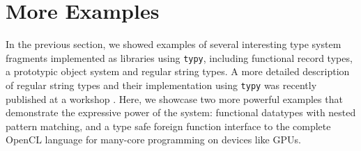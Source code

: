 \documentclass[preprint,10pt]{sigplanconf}
\newcommand{\lip}[1]{\lstinline[language=Python,basicstyle=\ttfamily\small,deletendkeywords={tuple,buffer,map}]{#1}}
\begin{document}


\section{More Examples}\label{examples}
In the previous section, we showed examples of several interesting type system fragments implemented as libraries using \lip{typy}, including functional record types, a prototypic object system and regular string types. A more detailed description of regular string types and their implementation using \lip{typy} was recently published at a workshop \cite{sanitation-psp14}. Here, we showcase two more powerful examples that demonstrate the expressive power of the system: functional datatypes with nested pattern matching, and a type safe foreign function interface to the complete OpenCL language for many-core programming on devices like GPUs.
\end{document}
